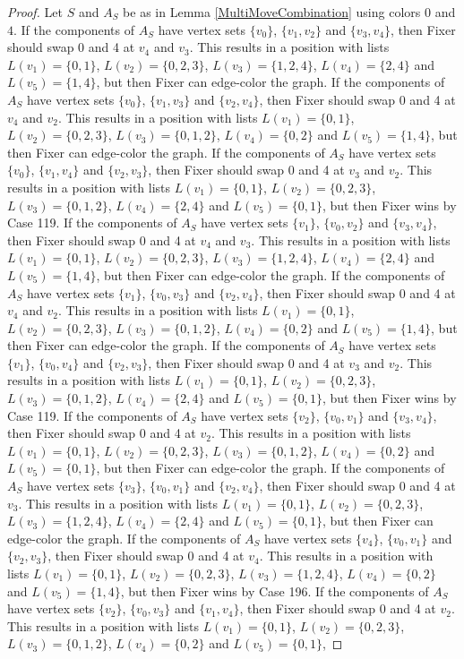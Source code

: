 \documentclass[12pt]{amsart}
\theoremstyle{plain}
\theoremstyle{definition}
\theoremstyle{remark}
\begin{document}
\begin{proof}
Let $S$ and $A_S$ be as in Lemma \ref{MultiMoveCombination} using colors $0$ and $4$. If the components of $A_S$ have vertex sets $\{v_0\}$, $\{v_1, v_2\}$ and $\{v_3, v_4\}$, then Fixer should swap 0 and 4 at $v_4$ and $v_3$. This results in a position with lists $L(v_1) = \{0, 1\}$, $L(v_2) = \{0, 2, 3\}$, $L(v_3) = \{1, 2, 4\}$, $L(v_4) = \{2, 4\}$ and $L(v_5) = \{1, 4\}$, but then Fixer can edge-color the graph. If the components of $A_S$ have vertex sets $\{v_0\}$, $\{v_1, v_3\}$ and $\{v_2, v_4\}$, then Fixer should swap 0 and 4 at $v_4$ and $v_2$. This results in a position with lists $L(v_1) = \{0, 1\}$, $L(v_2) = \{0, 2, 3\}$, $L(v_3) = \{0, 1, 2\}$, $L(v_4) = \{0, 2\}$ and $L(v_5) = \{1, 4\}$, but then Fixer can edge-color the graph. If the components of $A_S$ have vertex sets $\{v_0\}$, $\{v_1, v_4\}$ and $\{v_2, v_3\}$, then Fixer should swap 0 and 4 at $v_3$ and $v_2$. This results in a position with lists $L(v_1) = \{0, 1\}$, $L(v_2) = \{0, 2, 3\}$, $L(v_3) = \{0, 1, 2\}$, $L(v_4) = \{2, 4\}$ and $L(v_5) = \{0, 1\}$, but then Fixer wins by Case 119. If the components of $A_S$ have vertex sets $\{v_1\}$, $\{v_0, v_2\}$ and $\{v_3, v_4\}$, then Fixer should swap 0 and 4 at $v_4$ and $v_3$. This results in a position with lists $L(v_1) = \{0, 1\}$, $L(v_2) = \{0, 2, 3\}$, $L(v_3) = \{1, 2, 4\}$, $L(v_4) = \{2, 4\}$ and $L(v_5) = \{1, 4\}$, but then Fixer can edge-color the graph. If the components of $A_S$ have vertex sets $\{v_1\}$, $\{v_0, v_3\}$ and $\{v_2, v_4\}$, then Fixer should swap 0 and 4 at $v_4$ and $v_2$. This results in a position with lists $L(v_1) = \{0, 1\}$, $L(v_2) = \{0, 2, 3\}$, $L(v_3) = \{0, 1, 2\}$, $L(v_4) = \{0, 2\}$ and $L(v_5) = \{1, 4\}$, but then Fixer can edge-color the graph. If the components of $A_S$ have vertex sets $\{v_1\}$, $\{v_0, v_4\}$ and $\{v_2, v_3\}$, then Fixer should swap 0 and 4 at $v_3$ and $v_2$. This results in a position with lists $L(v_1) = \{0, 1\}$, $L(v_2) = \{0, 2, 3\}$, $L(v_3) = \{0, 1, 2\}$, $L(v_4) = \{2, 4\}$ and $L(v_5) = \{0, 1\}$, but then Fixer wins by Case 119. If the components of $A_S$ have vertex sets $\{v_2\}$, $\{v_0, v_1\}$ and $\{v_3, v_4\}$, then Fixer should swap 0 and 4 at $v_2$. This results in a position with lists $L(v_1) = \{0, 1\}$, $L(v_2) = \{0, 2, 3\}$, $L(v_3) = \{0, 1, 2\}$, $L(v_4) = \{0, 2\}$ and $L(v_5) = \{0, 1\}$, but then Fixer can edge-color the graph. If the components of $A_S$ have vertex sets $\{v_3\}$, $\{v_0, v_1\}$ and $\{v_2, v_4\}$, then Fixer should swap 0 and 4 at $v_3$. This results in a position with lists $L(v_1) = \{0, 1\}$, $L(v_2) = \{0, 2, 3\}$, $L(v_3) = \{1, 2, 4\}$, $L(v_4) = \{2, 4\}$ and $L(v_5) = \{0, 1\}$, but then Fixer can edge-color the graph. If the components of $A_S$ have vertex sets $\{v_4\}$, $\{v_0, v_1\}$ and $\{v_2, v_3\}$, then Fixer should swap 0 and 4 at $v_4$. This results in a position with lists $L(v_1) = \{0, 1\}$, $L(v_2) = \{0, 2, 3\}$, $L(v_3) = \{1, 2, 4\}$, $L(v_4) = \{0, 2\}$ and $L(v_5) = \{1, 4\}$, but then Fixer wins by Case 196. If the components of $A_S$ have vertex sets $\{v_2\}$, $\{v_0, v_3\}$ and $\{v_1, v_4\}$, then Fixer should swap 0 and 4 at $v_2$. This results in a position with lists $L(v_1) = \{0, 1\}$, $L(v_2) = \{0, 2, 3\}$, $L(v_3) = \{0, 1, 2\}$, $L(v_4) = \{0, 2\}$ and $L(v_5) = \{0, 1\}$, 
\end{proof}
\end{document}
